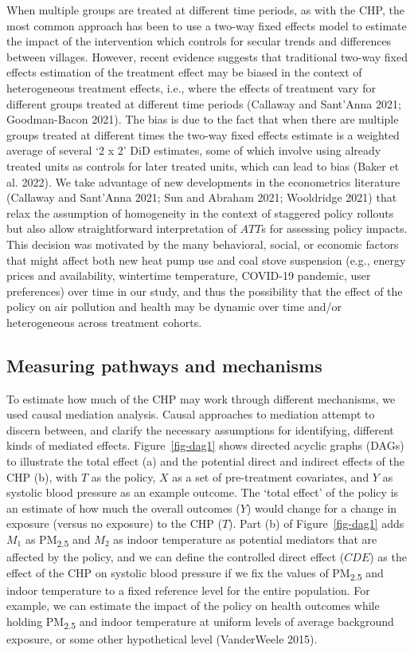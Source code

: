\documentclass[
  letterpaper,
  DIV=11,
  numbers=noendperiod]{scrartcl}
\begin{document}
When multiple groups are treated at different time periods, as with the
CHP, the most common approach has been to use a two-way fixed effects
model to estimate the impact of the intervention which controls for
secular trends and differences between villages. However, recent
evidence suggests that traditional two-way fixed effects estimation of
the treatment effect may be biased in the context of heterogeneous
treatment effects, i.e., where the effects of treatment vary for
different groups treated at different time periods (Callaway and
Sant'Anna 2021; Goodman-Bacon 2021). The bias is due to the fact that
when there are multiple groups treated at different times the two-way
fixed effects estimate is a weighted average of several `2 x 2' DiD
estimates, some of which involve using already treated units as controls
for later treated units, which can lead to bias (Baker et al. 2022). We
take advantage of new developments in the econometrics literature
(Callaway and Sant'Anna 2021; Sun and Abraham 2021; Wooldridge 2021)
that relax the assumption of homogeneity in the context of staggered
policy rollouts but also allow straightforward interpretation of
\(ATT\)s for assessing policy impacts. This decision was motivated by
the many behavioral, social, or economic factors that might affect both
new heat pump use and coal stove suspension (e.g., energy prices and
availability, wintertime temperature, COVID-19 pandemic, user
preferences) over time in our study, and thus the possibility that the
effect of the policy on air pollution and health may be dynamic over
time and/or heterogeneous across treatment cohorts.

\subsection{Measuring pathways and
mechanisms}\label{measuring-pathways-and-mechanisms}

To estimate how much of the CHP may work through different mechanisms,
we used causal mediation analysis. Causal approaches to mediation
attempt to discern between, and clarify the necessary assumptions for
identifying, different kinds of mediated effects. Figure~\ref{fig-dag1}
shows directed acyclic graphs (DAGs) to illustrate the total effect (a)
and the potential direct and indirect effects of the CHP (b), with \(T\)
as the policy, \(X\) as a set of pre-treatment covariates, and \(Y\) as
systolic blood pressure as an example outcome. The `total effect' of the
policy  is an estimate of how much the overall outcomes
(\(Y\)) would change for a change in exposure (versus no exposure) to
the CHP (\(T\)). Part (b) of Figure~\ref{fig-dag1} adds \(M_{1}\) as
PM\textsubscript{2.5} and \(M_{2}\) as indoor temperature as potential
mediators that are affected by the policy, and we can define the
controlled direct effect (\(CDE\)) as the effect of the CHP on systolic
blood pressure if we fix the values of PM\textsubscript{2.5} and indoor
temperature to a fixed reference level for the entire population. For
example, we can estimate the impact of the policy on health outcomes
while holding PM\textsubscript{2.5} and indoor temperature at uniform
levels of average background exposure, or some other hypothetical level
(VanderWeele 2015).
\end{document}

